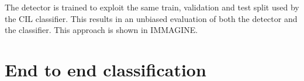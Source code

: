 The detector is trained to exploit the same train, validation and test split used by the CIL classifier. This results in an unbiased evaluation of both the detector and the classifier. This approach is shown in IMMAGINE.

\section{End to end classification}
\label{sec:exp-end2end}

